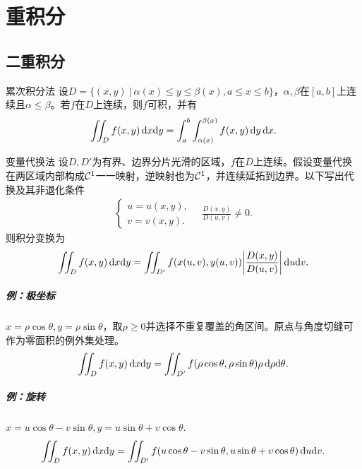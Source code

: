 \chapter{重积分}
\section{二重积分}
\begin{theorem}{累次积分法}{}
	设$D = \{(x,y)~|~\alpha(x) \leqslant y \leqslant \beta(x),a \leqslant x \leqslant b\}$，$\alpha,\beta$在$[a,b]$上连续且$\alpha \leq \beta$。若$f$在$D$上连续，则$f$可积，并有
	\begin{equation}\label{eq:calc-iterated-double-integral}
		\iint_Df(x,y)\mathop{}\!\mathrm{d} x\mathrm{d} y = \int_a^b\int_{\alpha(x)}^{\beta(x)}f(x,y)\mathop{}\!\mathrm{d} y\mathop{}\!\mathrm{d} x.
	\end{equation}
\end{theorem}
\begin{theorem}{变量代换法}{}
	设$D,D'$为有界、边界分片光滑的区域，$f$在$\overline D$上连续。假设变量代换在两区域内部构成$\mathcal{C}^1$一一映射，逆映射也为$\mathcal{C}^1$，并连续延拓到边界。以下写出代换及其非退化条件
	\begin{align*}
		\begin{cases}
			u = u(x,y), \\
			v = v(x,y).
		\end{cases}
		\quad\frac{D(x,y)}{D(u,v)} \neq 0.
	\end{align*}
	则积分变换为
	\begin{equation}\label{eq:calc-planar-substitution}
		\iint_Df(x,y)\mathop{}\!\mathrm{d} x\mathrm{d} y = \iint_{D'}f(x(u,v),y(u,v))\biggl\lvert\frac{D(x,y)}{D(u,v)}\biggr\rvert\mathop{}\!\mathrm{d} u\mathrm{d} v.
	\end{equation}
\end{theorem}
\paragraph{例：极坐标}$x = \rho\cos\theta,y = \rho\sin\theta$，取$\rho \geq 0$并选择不重复覆盖的角区间。原点与角度切缝可作为零面积的例外集处理。
\begin{equation}\label{eq:calc-polar-integral}
	\iint_Df(x,y)\mathop{}\!\mathrm{d} x\mathrm{d} y = \iint_{D'}f(\rho\cos\theta,\rho\sin\theta)\rho\mathop{}\!\mathrm{d}\rho\mathrm{d}\theta.
\end{equation}
\paragraph{例：旋转}$x = u\cos\theta - v\sin\theta,y = u\sin\theta + v\cos\theta.$
\begin{equation}\label{eq:calc-rotated-coordinates}
	\iint_Df(x,y)\mathop{}\!\mathrm{d} x\mathrm{d} y = \iint_{D'}f(u\cos\theta - v\sin\theta,u\sin\theta + v\cos\theta)\mathop{}\!\mathrm{d} u\mathrm{d} v.
\end{equation}

